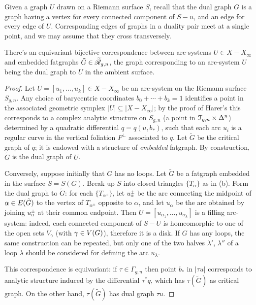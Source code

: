 Given a graph $U$ drawn on a Riemann surface $S$, recall that the dual
graph $G$ is a graph having a vertex for every connected component of
$S - u$, and an edge for every edge of $U$.  Corresponding edges of
graphs in a duality pair meet at a single point, and we may assume
that they cross transversely.
\begin{lemma}
  \label{lemma:arcs-to-rg}
  There's an equivariant bijective correspondence between arc-systems
  $U \in X - X_\infty$ and embedded fatgraphs ${\tilde G} \in \mathscr{\widetilde R}_{g,n}$,
  the graph corresponding to an arc-system $U$ being the dual graph to
  $U$ in the ambient surface.
\end{lemma}
\begin{proof}
  Let $U = [u_1, \ldots, u_k] \in X - X_\infty$ be an arc-system on the Riemann
  surface $S_{g,n}$.  Any choice of barycentric coordinates $b_0 + \cdots +
  b_k = 1$ identifies a point in the associated geometric
  symplex $|U| \subseteq |X - X_\infty|$; by the proof of Harer's 
  this corresponds to a complex analytic structure on $S_{g,n}$ (a
  point in $\mathcal{T}_{g,n} \times \Delta^n$) determined by a quadratic differential $q
  = q(u, b_*)$, such that each arc $u_i$ is a regular curve in the
  vertical foliation $F^\perp$ associated to $q$.  Let ${\tilde G}$ be the
  critical graph of $q$; it is endowed with a structure of
  \emph{embedded} fatgraph.  By construction, ${\tilde G}$ is the
  dual graph of $U$.

  Conversely, suppose initially that $G$ has no loops.  Let ${\tilde
    G}$ be a fatgraph embedded in the surface $S = S(G)$.  Break up
  $S$ into closed triangles $\{ T_\alpha \}$ as in
  (b).  Form the dual graph to ${\tilde G}$:
  for each $\{ T_{\alpha^\pm} \}$, let $u_\alpha^\pm$ be the arc
  connecting the midpoint of $\alpha \in E({\tilde G})$ to the
  vertex of $T_{\alpha^\pm}$ opposite to $\alpha$, and let $u_\alpha$
  be the arc obtained by joining $u_\alpha^\pm$ at their common
  endpoint.  Then $U = [u_{\alpha_1}, \ldots, u_{\alpha_k}]$ is a
  filling arc-system: indeed, each connected component of $S - U$ is
  homeomorphic to one of the open sets $V_\gamma$ (with $\gamma \in
  V(G)$), therefore it is a disk.
  If $G$ has any loops, the same construction can be repeated, but
  only one of the two halves $\lambda'$, $\lambda''$ of a loop
  $\lambda$ should be  considered for defining the arc $u_\lambda$.

  This correspondence is equivariant: if $\tau \in \Gamma_{g,n}$ then point
  $b_*$ in $|\tau u|$ corresponds to analytic structure induced by the
  differential $\tau^*q$, which has $\tau({\tilde G})$ as critical graph.
  On the other hand, $\tau({\tilde G})$ has dual graph $\tau u$.
\end{proof}

